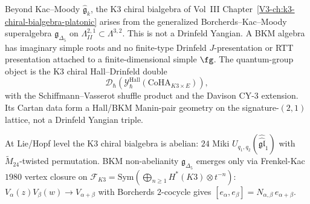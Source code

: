 \begin{remark}
\label{rem:km-K3xE}
Beyond Kac--Moody $\widehat{\mathfrak{g}}_k$, the K3 chiral
bialgebra of Vol~III Chapter~\ref{V3-ch:k3-chiral-bialgebra-platonic}
arises from the generalized Borcherds--Kac--Moody superalgebra
\(\mathfrak{g}_{\Delta_5}\) on
\(\Lambda^{2,1}_{II} \subset \Lambda^{3,2}\). This is not a
Drinfeld Yangian. A BKM algebra has imaginary simple roots and no
finite-type Drinfeld \(J\)-presentation or RTT presentation attached
to a finite-dimensional simple \(\fg\). The quantum-group object is
the K3 chiral Hall--Drinfeld double
\[
\mathcal{D}_\hbar\!\left(
\mathcal{Y}^{\mathrm{Hall}}_\hbar(\mathrm{CoHA}_{K3 \times E})
\right),
\]
with the Schiffmann--Vasserot shuffle product and the Davison
CY-\(3\) extension. Its Cartan data form a Hall/BKM Manin-pair
geometry on the signature-\((2,1)\) lattice, not a Drinfeld Yangian
triple.
\end{remark}

\begin{remark}
\label{rem:km-frenkel-kac-K3}
At Lie/Hopf level the K3 chiral bialgebra is abelian: $24$ Miki $U_{q_1, q_2}(\widehat{\widehat{\mathfrak{gl}}}_1)$ with $\widetilde{M}_{24}$-twisted permutation. BKM non-abelianity $\mathfrak{g}_{\Delta_5}$ emerges only via Frenkel-Kac $1980$ vertex closure on $\mathcal{F}_{K3} = \mathrm{Sym}(\bigoplus_{n \ge 1} H^*(K3) \otimes t^{-n})$: $V_\alpha(z) V_\beta(w) \to V_{\alpha + \beta}$ with Borcherds $2$-cocycle gives $[e_\alpha, e_\beta] = N_{\alpha, \beta}\, e_{\alpha + \beta}$.
\end{remark}
